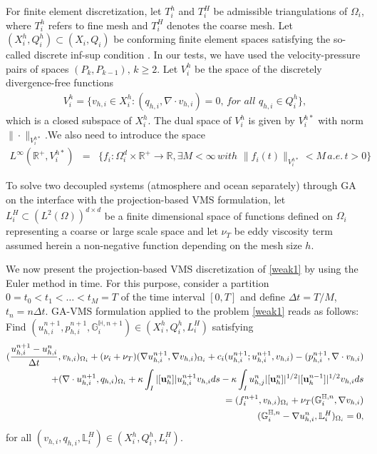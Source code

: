 \documentclass[10pt]{article}%
\numberwithin{equation}{section}
\newcommand{\bff}{{  f}}
\begin{document}
For finite element discretization, let $T_{i}^h$ and $T_i^H$ be  admissible triangulations of $\Omega_i$, where  $T_{i}^h$ refers to fine mesh and $T_i^H$ denotes the coarse mesh. Let $(X_{i}^h, { Q^h_{i}}) \subset (X_i,Q_i)$ be  conforming finite element spaces satisfying the so-called discrete inf-sup condition \cite{GR79,G89}. In our tests, we have used the velocity-pressure pairs of spaces $(P_k,P_{k-1}),\,k\geq 2$.
Let $V_{i}^h$ be the space of the discretely divergence-free functions
\begin{eqnarray}
V_{i}^h=\{v_{h,i}\in X_i^h: (q_{h,i},\nabla \cdot v_{h,i})=0, \, for \,\, all \,\, q_{h,i} \in Q_{i}^h\},
\end{eqnarray}
which is a closed subspace of $X_i^h$. The dual space of $V_i^h$ is given by $V_i^{h*}$ with norm $\|\cdot\|_{V_i^{h*}}$.We also need to introduce the space
\begin{eqnarray}
L^{\infty}(\mathbb{R}^+,V_i^{h*})&=&\{f_i:\Omega_{i}^d\times\mathbb{R}^+\to \mathbb{R}, \exists M<\infty \, with \,\, \|f_i(t)\|_{V_i^{h*}}<M \, a.e.\, t>0\}
\end{eqnarray}

To solve two decoupled systems (atmosphere and ocean separately) through GA on the interface with the projection-based VMS formulation, let $L_i^H \subset (L^2(\Omega))^{d\times d} $ be a finite dimensional space of functions defined on $\Omega_i$ representing a coarse or large scale space and let  $\nu_T$  be eddy viscosity term assumed herein a non-negative function depending on the mesh size $h$.

We now present the projection-based VMS discretization of \eqref{weak1} by using the Euler method in time. For this purpose, consider a partition $0=t_0<t_1<\dots<t_M=T$ of the time interval $[0,T]$ and define $\Delta t=T/M$, $t_n=n\Delta t$. GA-VMS formulation applied to the problem \eqref{weak1} reads as follows: Find $(u_{h,i}^{n+1},p_{h,i}^{n+1},\mathbb{G}_i^{\mathbb{H},{n+1}})\in (X_{i}^h,Q_{i}^h,L_i^H)$ satisfying
\begin{eqnarray}
(\frac{{u^{n+1}_{h,i}}-u_{h,i}^{n}}{\Delta t} ,v_{h,i})_{\Omega_i} +(\nu_i+\nu_T)(\nabla  u_{h,i}^{n+1},\nabla v_{h,i})_{\Omega_i} +c_i(u_{h,i}^{n+1}; u_{h,i}^{n+1},v_{h,i})
-(p_{h,i}^{n+1},\nabla \cdot v_{h,i}) \nonumber
\\
 + (\nabla\cdot u_{h,i}^{n+1},q_{h,i})_{\Omega_i}+\kappa \int_{I}|[{\bf u}_h^n]|u_{h,i}^{n+1}v_{h,i}ds
-\kappa \int_{I}u_{h,j}^n|[{\bf u}_h^n]|^{1/2}|[{\bf u}_h^{n-1}]|^{1/2}v_{h,i}ds \nonumber
\\
=(\bff_i^{n+1},v_{h,i})_{\Omega_i}+\nu_T(\mathbb{G}_i^{\mathbb{H},n},\nabla v_{h,i}) \label{BE7}\\
(\mathbb{G}_i^{\mathbb{H},n}-\nabla u_{h,i}^n, \mathbb{L}_i^H)_{\Omega_i}=0,\label{alg4}
\end{eqnarray}
for all $(v_{h,i},q_{h,i},\mathbb{L}_i^H) \in (X_{i}^h,Q_{i}^h,L_i^H)$.
\end{document}
